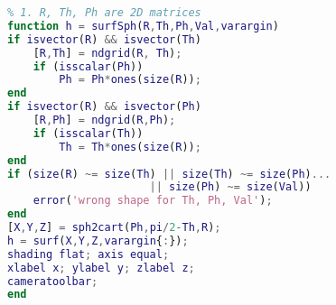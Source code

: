 
\begin{lstlisting}[language=matlab]
% surf() in spherical coordinate
% 1. R, Th, Ph are 2D matrices
function h = surfSph(R,Th,Ph,Val,varargin)
if isvector(R) && isvector(Th)
    [R,Th] = ndgrid(R, Th);
    if (isscalar(Ph))
        Ph = Ph*ones(size(R));
end
if isvector(R) && isvector(Ph)
    [R,Ph] = ndgrid(R,Ph);
    if (isscalar(Th))
        Th = Th*ones(size(R));
end
if (size(R) ~= size(Th) || size(Th) ~= size(Ph)...
                      || size(Ph) ~= size(Val))
    error('wrong shape for Th, Ph, Val');
end
[X,Y,Z] = sph2cart(Ph,pi/2-Th,R);
h = surf(X,Y,Z,varargin{:});
shading flat; axis equal;
xlabel x; ylabel y; zlabel z;
cameratoolbar;
end
\end{lstlisting}
